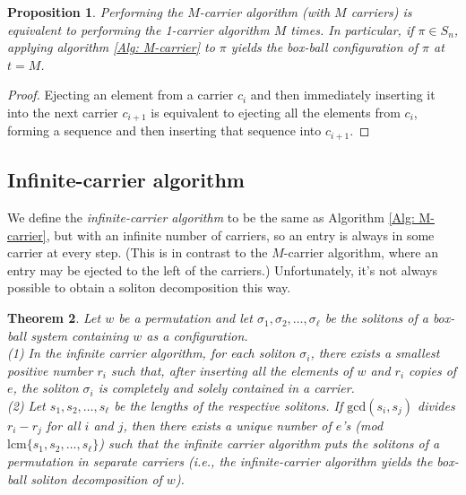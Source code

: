 \documentclass[submission]{FPSAC2021}
\theoremstyle{plain}
\newtheorem{theorem}{Theorem}[section]
\newtheorem{proposition}[theorem]{Proposition}
\theoremstyle{definition}
\numberwithin{equation}{section}
\begin{document}
\begin{proposition}\label{thm: m-carrier alg same as C^m}
    Performing the $M$-carrier algorithm (with $M$ carriers) is equivalent to performing the 1-carrier algorithm $M$ times. In particular, if $\pi\in S_n$, applying algorithm \ref{Alg: M-carrier} to $\pi$ yields the box-ball configuration of $\pi$ at $t=M$.
\end{proposition}
    \begin{proof}
    Ejecting an element from a carrier $c_i$ and then immediately inserting it into 
    the next carrier
    $c_{i+1}$ is equivalent to ejecting all the elements from $c_i$, forming a sequence and then inserting that sequence into $c_{i+1}.$
    \end{proof}
\subsection{Infinite-carrier algorithm}

 We define the \emph{infinite-carrier  
 algorithm} to be 
the same as Algorithm \ref{Alg: M-carrier}, 
but with an infinite number of carriers, so an entry is always in some carrier at every step. (This is in contrast to the $M$-carrier algorithm, where an entry may be ejected to the left of the carriers.) Unfortunately, it's not always possible to obtain a soliton decomposition this way.




\begin{theorem}
Let $w$ be a permutation and 
let $\sigma_1,\sigma_2, \dots,  \sigma_\ell$ be the  solitons of a box-ball system containing $w$ as a configuration.
\\
(1) In the infinite carrier algorithm, 
for each soliton $\sigma_i$, 
there exists a smallest positive number $r_i$ such that, after inserting all the elements of $w$ and $r_i$ copies of $e$, 
the soliton $\sigma_i$ is completely and solely contained in a carrier.
\\ 
(2) Let $s_1,s_2, \dots ,s_\ell$ be the lengths of the respective solitons. 
 If  
 $\text{gcd}(s_i,s_j)$ divides $r_i-r_j$ for all $i$ and $j$, 
 then 
 there exists a unique number of $e$'s (mod $\text{lcm}\{s_1,s_2, \dots ,s_\ell\}$) 
such that the infinite carrier algorithm puts the solitons of a permutation in separate carriers 
(i.e., 
the infinite-carrier algorithm 
yields the box-ball soliton decomposition of $w$). 
\end{theorem}
\end{document}
